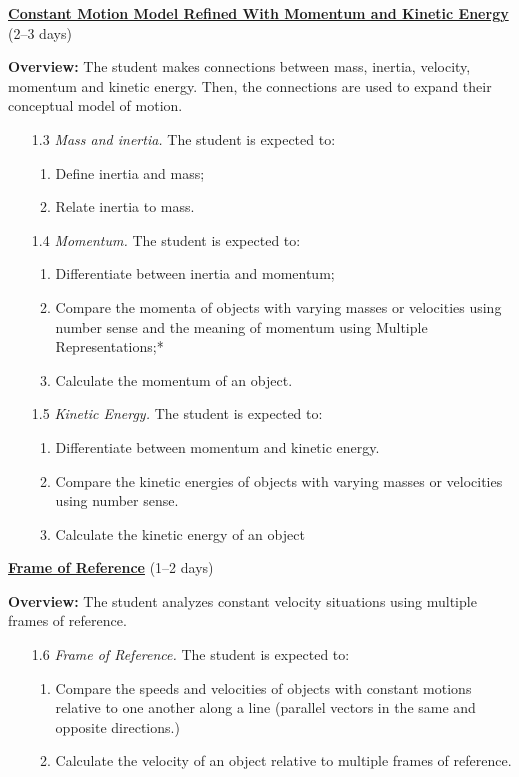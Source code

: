 \documentclass[dvipsnames]{article}
\begin{document}
\textbf{\underline{Constant Motion Model Refined With Momentum and Kinetic Energy}} (2--3 days)

\textbf{Overview:} The student makes connections between mass, inertia, velocity, momentum and kinetic energy. Then, the connections are used to expand their conceptual model of motion.

\begin{enumerate}[itemsep=0pt]
    \item[1.3] \textit{Mass and inertia.} The student is expected to:
    \begin{enumerate}[itemsep=0pt,topsep=0pt]
        \item Define inertia and mass;
        \item Relate inertia to mass.
    \end{enumerate}
    \item[1.4] \textit{Momentum.} The student is expected to:
    \begin{enumerate}[itemsep=0pt,topsep=0pt]
        \item Differentiate between inertia and momentum;
        \item Compare the momenta of objects with varying masses or velocities using number sense and the meaning of momentum using Multiple Representations;*
        \item Calculate the momentum of an object.
    \end{enumerate}
    \item[1.5] \textit{Kinetic Energy.} The student is expected to:
    \begin{enumerate}[itemsep=0pt,topsep=0pt]
        \item Differentiate between momentum and kinetic energy.
        \item Compare the kinetic energies of objects with varying masses or velocities using number sense.
        \item Calculate the kinetic energy of an object
    \end{enumerate}
\end{enumerate}




\textbf{\underline{Frame of Reference}} (1--2 days)

\textbf{Overview:} The student analyzes constant velocity situations using multiple frames of reference.

\begin{enumerate}[itemsep=0pt]
    \item[1.6] \textit{Frame of Reference.} The student is expected to:
    \begin{enumerate}[itemsep=0pt,topsep=0pt]
        \item Compare the speeds and velocities of objects with constant motions relative to one another along a line (parallel vectors in the same and opposite directions.)
        \item Calculate the velocity of an object relative to multiple frames of reference.
    \end{enumerate}
\end{enumerate}
\end{document}

